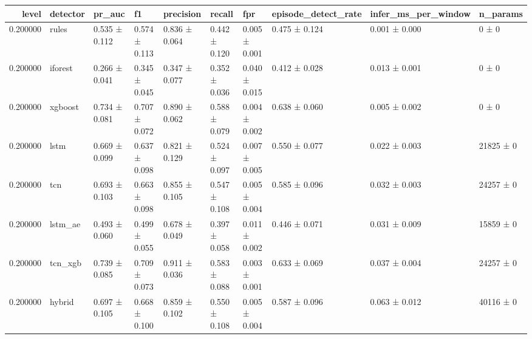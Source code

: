 \begin{tabular}{rlllllllll}
\toprule
level & detector & pr\_auc & f1 & precision & recall & fpr & episode\_detect\_rate & infer\_ms\_per\_window & n\_params \\
\midrule
0.200000 & rules & 0.535 ± 0.112 & 0.574 ± 0.113 & 0.836 ± 0.064 & 0.442 ± 0.120 & 0.005 ± 0.001 & 0.475 ± 0.124 & 0.001 ± 0.000 & 0 ± 0 \\
0.200000 & iforest & 0.266 ± 0.041 & 0.345 ± 0.045 & 0.347 ± 0.077 & 0.352 ± 0.036 & 0.040 ± 0.015 & 0.412 ± 0.028 & 0.013 ± 0.001 & 0 ± 0 \\
0.200000 & xgboost & 0.734 ± 0.081 & 0.707 ± 0.072 & 0.890 ± 0.062 & 0.588 ± 0.079 & 0.004 ± 0.002 & 0.638 ± 0.060 & 0.005 ± 0.002 & 0 ± 0 \\
0.200000 & lstm & 0.669 ± 0.099 & 0.637 ± 0.098 & 0.821 ± 0.129 & 0.524 ± 0.097 & 0.007 ± 0.005 & 0.550 ± 0.077 & 0.022 ± 0.003 & 21825 ± 0 \\
0.200000 & tcn & 0.693 ± 0.103 & 0.663 ± 0.098 & 0.855 ± 0.105 & 0.547 ± 0.108 & 0.005 ± 0.004 & 0.585 ± 0.096 & 0.032 ± 0.003 & 24257 ± 0 \\
0.200000 & lstm\_ae & 0.493 ± 0.060 & 0.499 ± 0.055 & 0.678 ± 0.049 & 0.397 ± 0.058 & 0.011 ± 0.002 & 0.446 ± 0.071 & 0.031 ± 0.009 & 15859 ± 0 \\
0.200000 & tcn\_xgb & 0.739 ± 0.085 & 0.709 ± 0.073 & 0.911 ± 0.036 & 0.583 ± 0.088 & 0.003 ± 0.001 & 0.633 ± 0.069 & 0.037 ± 0.004 & 24257 ± 0 \\
0.200000 & hybrid & 0.697 ± 0.105 & 0.668 ± 0.100 & 0.859 ± 0.102 & 0.550 ± 0.108 & 0.005 ± 0.004 & 0.587 ± 0.096 & 0.063 ± 0.012 & 40116 ± 0 \\
\bottomrule
\end{tabular}
